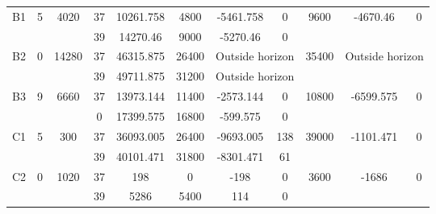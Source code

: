 \begin{table}
\begin{tabular}{c||c|c||c|c|c|c|c||c|c|c}
         &
        
      \\
      \hline
      \multirow{2}{*}{B1} &
      \multirow{2}{*}{5} &
      \multirow{2}{*}{4020} &
      37 &
      10261.758 &
      4800 &
        -5461.758 &
        0 &
      \multirow{2}{*}{9600} &
        \multirow{2}{*}{-4670.46} &
        \multirow{2}{*}{0}
      \\
      \cline{4-8}
       &
       &
       &
      39 &
      14270.46 &
      9000 &
        -5270.46 &
        0 &
      
         &
        
      \\
      \hline
      \multirow{2}{*}{B2} &
      \multirow{2}{*}{0} &
      \multirow{2}{*}{14280} &
      37 &
      46315.875 &
      26400 &
        \multicolumn{2}{|c||}{Outside horizon} &
      \multirow{2}{*}{35400} &
        \multicolumn{2}{c}{\multirow{2}{*}{Outside horizon}}
      \\
      \cline{4-8}
       &
       &
       &
      39 &
      49711.875 &
      31200 &
        \multicolumn{2}{|c||}{Outside horizon} &
      
        
      \\
      \hline
      \multirow{2}{*}{B3} &
      \multirow{2}{*}{9} &
      \multirow{2}{*}{6660} &
      37 &
      13973.144 &
      11400 &
        -2573.144 &
        0 &
      \multirow{2}{*}{10800} &
        \multirow{2}{*}{-6599.575} &
        \multirow{2}{*}{0}
      \\
      \cline{4-8}
       &
       &
       &
      0 &
      17399.575 &
      16800 &
        -599.575 &
        0 &
      
         &
        
      \\
      \hline
      \multirow{2}{*}{C1} &
      \multirow{2}{*}{5} &
      \multirow{2}{*}{300} &
      37 &
      36093.005 &
      26400 &
        -9693.005 &
        138 &
      \multirow{2}{*}{39000} &
        \multirow{2}{*}{-1101.471} &
        \multirow{2}{*}{0}
      \\
      \cline{4-8}
       &
       &
       &
      39 &
      40101.471 &
      31800 &
        -8301.471 &
        61 &
      
         &
        
      \\
      \hline
      \multirow{2}{*}{C2} &
      \multirow{2}{*}{0} &
      \multirow{2}{*}{1020} &
      37 &
      198 &
      0 &
        -198 &
        0 &
      \multirow{2}{*}{3600} &
        \multirow{2}{*}{-1686} &
        \multirow{2}{*}{0}
      \\
      \cline{4-8}
       &
       &
       &
      39 &
      5286 &
      5400 &
        114 &
        0 &
      

\end{tabular}
\end{table}

